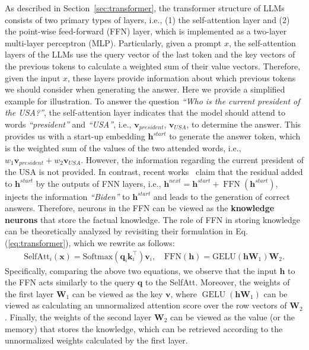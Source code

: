 \documentclass[acmsmall, screen]{acmart}
\begin{document}
As described in Section~\ref{sec:transformer}, the transformer structure of LLMs consists of two primary types of layers, i.e., (1) the self-attention layer and (2) the point-wise feed-forward (FFN) layer, which is implemented as a two-layer multi-layer perceptron (MLP). 
Particularly, given a prompt $x$, the self-attention layers of the LLMs use the query vector of the last token and the key vectors of the previous tokens to calculate a weighted sum of their value vectors. Therefore, given the input $x$, these layers provide information about which previous tokens we should consider when generating the answer. Here we provide a simplified example for illustration. To answer the question \textit{``Who is the current president of the USA?''}, the self-attention layer indicates that the model should attend to words \textit{``president''} and \textit{``USA''}, i.e., $\textbf{v}_{president}$, $\textbf{v}_{USA}$, to determine the answer. This provides us with a start-up embedding $\textbf{h}^{start}$ to generate the answer token, which is the weighted sum of the values of the two attended words, i.e., $w_{1}\textbf{v}_{president} + w_{2}\textbf{v}_{USA}$. However, the information regarding the current president of the USA is not provided. In contrast, recent works~\cite{geva2021transformer,geva2022transformer,meng2022locating,meng2023mass} claim that the residual added to $\textbf{h}^{start}$ by the outputs of FNN layers, i.e., $\textbf{h}^{next} = \textbf{h}^{start} + \operatorname{FFN}(\textbf{h}^{start})$, injects the information \textit{``Biden''} to $\textbf{h}^{start}$ and leads to the generation of correct answers. Therefore, neurons in the FFN can be viewed as the \textbf{knowledge neurons} that store the factual knowledge. The role of FFN in storing knowledge can be theoretically analyzed by revisiting their formulation in Eq. (\ref{eq:transformer}), which we rewrite as follows:
\begin{equation}
\label{eq:geva}
\begin{aligned}
\text{SelfAtt}_i(\textbf{x})=\text{Softmax}\left(\textbf{q}_i \textbf{k}_i^\top\right) \textbf{v}_i, \quad
\text{FFN}(\textbf{h})=\text{GELU}\left(\textbf{h} \textbf{W}_1\right) \textbf{W}_2.
\end{aligned}
\end{equation}
Specifically, comparing the above two equations, we observe that the input $\textbf{h}$ to the FFN acts similarly to the query $\textbf{q}$ to the SelfAtt. Moreover, the weights of the first layer $\mathbf{W}_{1}$ can be viewed as the key $\mathbf{v}$, where $\operatorname{GELU}\left(\textbf{h} \textbf{W}_1\right)$ can be viewed as calculating an unnormalized attention score over the row vectors of $\textbf{W}_{2}$. Finally, the weights of the second layer $\textbf{W}_{2}$  can be viewed as the value (or the memory) that stores the knowledge, which can be retrieved according to the unnormalized weights calculated by the first layer. 
\end{document}
